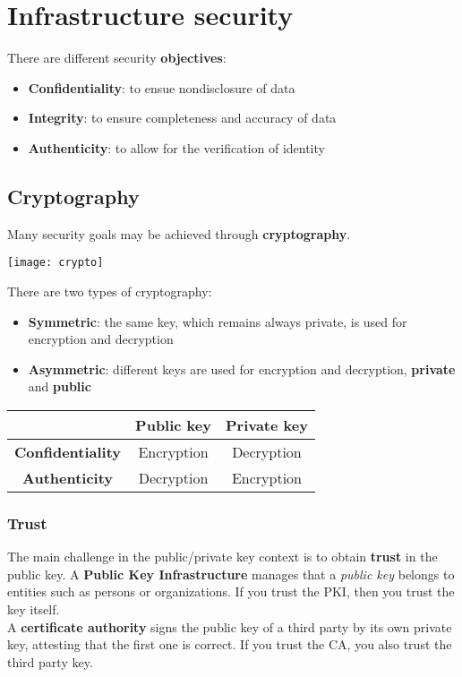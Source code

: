 \newpage
\section{Infrastructure security}
There are different security \textbf{objectives}:
\begin{itemize}
	\item \textbf{Confidentiality}: to ensue nondisclosure of data
	\item \textbf{Integrity}: to ensure completeness and accuracy of data
	\item \textbf{Authenticity}: to allow for the verification of identity
\end{itemize}

\subsection{Cryptography}
Many security goals may be achieved through \textbf{cryptography}.
\begin{center}
	\texttt{[image: crypto]}
\end{center}	
There are two types of cryptography:
\begin{itemize}
	\item \textbf{Symmetric}: the same key, which remains always private, is used for encryption and decryption
	\item \textbf{Asymmetric}: different keys are used for encryption and decryption, \textbf{private} and \textbf{public}
\end{itemize}

\begin{table}[!h]
	\centering
	\begin{tabular}{c|c|c}
		& \textbf{Public key} & \textbf{Private key} \\
		\hline
		\textbf{Confidentiality} & Encryption & Decryption \\
		\textbf{Authenticity} & Decryption & Encryption
	\end{tabular}
\end{table}
\subsubsection{Trust}
The main challenge in the public/private key context is to obtain \textbf{trust} in the public key. A \textbf{Public Key Infrastructure} manages that a \textit{public key} belongs to entities such as persons or organizations. If you trust the PKI, then you trust the key itself.\\
A \textbf{certificate authority} signs the public key of a third party by its own private key, attesting that the first one is correct. If you trust the CA, you also trust the third party key.

